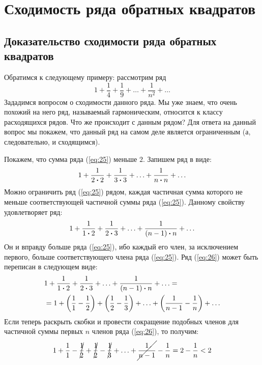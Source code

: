 \documentclass[12pt]{article}
\begin{document}
\section{Сходимость ряда обратных квадратов}
\subsection{Доказательство сходимости ряда обратных квадратов}
Обратимся к следующему примеру: рассмотрим ряд
\begin{equation}\label{eq:25}
    1 + \dfrac{1}{4} + \dfrac{1}{9} + \ldots + \dfrac{1}{n^2} + \ldots
\end{equation}
Зададимся вопросом о сходимости данного ряда. Мы уже знаем, что очень похожий на него ряд, называемый гармоническим, относится к классу расходящихся рядов. Что же происходит с данным рядом? Для ответа на данный вопрос мы покажем, что данный ряд на самом деле является ограниченным (а, следовательно, и сходящимся). 
\par
Покажем, что сумма ряда (\ref{eq:25}) меньше $2$. Запишем ряд в виде:
\begin{equation}
    1 + \dfrac{1}{2\vdot 2} + \dfrac{1}{3\vdot 3} + \ldots + \dfrac{1}{n\vdot n} + \ldots
\end{equation}
Можно ограничить ряд (\ref{eq:25}) рядом, каждая частичная сумма которого не меньше соответствующей частичной суммы ряда (\ref{eq:25}). Данному свойству удовлетворяет ряд:
\begin{equation}\label{eq:26}
    1 + \dfrac{1}{1\vdot2} + \dfrac{1}{2\vdot3} + \ldots + \dfrac{1}{\qty(n-1)\vdot n} + \ldots
\end{equation}
Он и вправду больше ряда (\ref{eq:25}), ибо каждый его член, за исключением первого, больше соответствующего члена ряда (\ref{eq:25}).
Ряд (\ref{eq:26}) может быть переписан в следующем виде:
\begin{equation}
\begin{split}
        &1 + \dfrac{1}{1\vdot2} + \dfrac{1}{2\vdot3} + \ldots + \dfrac{1}{\qty(n-1)\vdot n} + \ldots =\\
    & = 1 + \qty(\dfrac{1}{1} - \dfrac{1}{2}) + \qty(\dfrac{1}{2}  - \dfrac{1}{3}) + \ldots +\qty(\dfrac{1}{n-1} - \dfrac{1}{n}) + \ldots
\end{split}
\end{equation}
Если теперь раскрыть скобки и провести сокращение подобных членов для частичной суммы первых $n$ членов ряда (\ref{eq:26}), то получим:
\begin{equation}
    \begin{split}
        1 + \dfrac{1}{1} - \cancel{\dfrac{1}{2}} + \cancel{\dfrac{1}{2}}  - \cancel{\dfrac{1}{3}} + \ldots +\cancel{\dfrac{1}{n-1}} - \dfrac{1}{n} = 2 - \dfrac{1}{n} < 2
    \end{split}
\end{equation}
\end{document}
